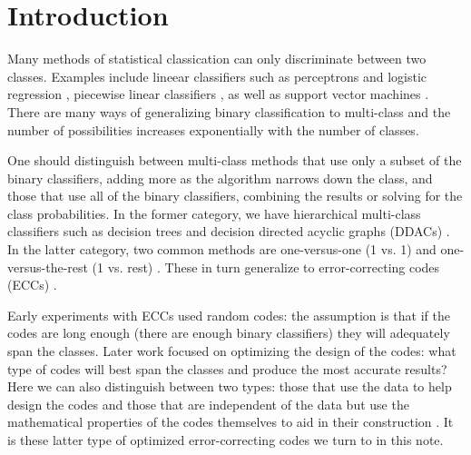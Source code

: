
\section{Introduction}

Many methods of statistical classication can only discriminate between two classes. 
Examples include lineear classifiers such as perceptrons and logistic regression \citep{Michie_etal1994}, 
piecewise linear classifiers \citep{Herman_Yeung1992,Mills2018},
as well as support vector machines \citep{Mueller_etal2001}.
There are many ways of generalizing binary classification to 
multi-class {\revision and the number of possibilities increases exponentially with
the number of classes.}

{\revision One should distinguish between multi-class methods that use only a subset
of the binary classifiers, adding more as the algorithm narrows down the
class, and those that use all of the binary classifiers, combining the results
or solving for the class probabilities.
In the former category, we have hierarchical multi-class classifiers 
such as decision trees \citep{Cheong_etal2004,Lee_Oh2003} and decision
directed acyclic graphs (DDACs) \citep{Platt_etal2000}.
In the latter category,
two common methods are one-versus-one (1 vs. 1) and one-versus-the-rest (1 vs. rest) \citep{Hsu_Lin2002}.
These in turn generalize to error-correcting codes (ECCs) \citep{Dietterich_Bakiri1995}.}

{\revision Early experiments with ECCs used random codes:
the assumption is that if the codes are long enough (there are enough binary classifiers)
they will adequately span the classes.
Later work focused on optimizing the design of the codes: what type of
codes will best span the classes and produce the most accurate results?
Here we can also distinguish between two types: those that use the data
to help design the codes \citep{Crammer_Singer2002,Zhou_etal2008,Zhong_Cheriet2013}
and those that are independent of the data but use the mathematical 
properties of the codes themselves to aid in their construction \citep{Allwein_etal2000,Windeatt_Ghaderi2002,Zhou_etal2019}.
It is these latter type of optimized error-correcting codes we turn to in this note.}

